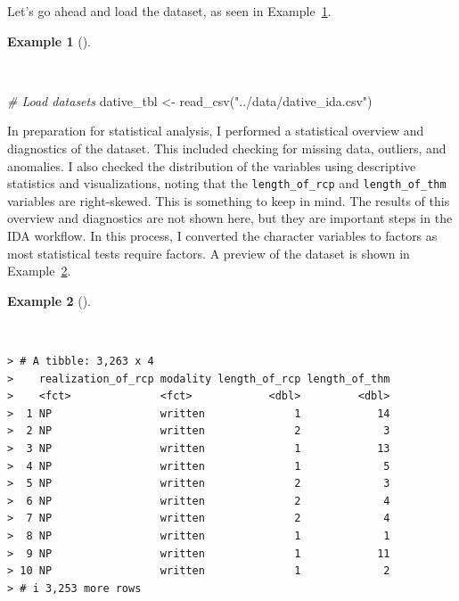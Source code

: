 \documentclass[
  letterpaper,
]{latex/krantz}
\newenvironment{Shaded}{\begin{snugshade}}{\end{snugshade}}
\newcommand{\CommentTok}[1]{\textcolor[rgb]{0.00,0.00,0.00}{\textit{#1}}}
\newcommand{\FunctionTok}[1]{\textcolor[rgb]{0.00,0.00,0.00}{#1}}
\newcommand{\NormalTok}[1]{\textcolor[rgb]{0.00,0.00,0.00}{#1}}
\newcommand{\OtherTok}[1]{\textcolor[rgb]{0.00,0.00,0.00}{#1}}
\newcommand{\StringTok}[1]{\textcolor[rgb]{0.00,0.00,0.00}{#1}}
\theoremstyle{definition}
\newtheorem{example}{Example}[chapter]
\theoremstyle{remark}
\begin{document}
Let's go ahead and load the dataset, as seen in
Example~\ref{exm-ida-cat-read-dative}.

\begin{example}[]\protect\hypertarget{exm-ida-cat-read-dative}{}\label{exm-ida-cat-read-dative}

~

\begin{Shaded}
\begin{Highlighting}[]
\CommentTok{\# Load datasets}
\NormalTok{dative\_tbl }\OtherTok{\textless{}{-}}
  \FunctionTok{read\_csv}\NormalTok{(}\StringTok{"../data/dative\_ida.csv"}\NormalTok{)}
\end{Highlighting}
\end{Shaded}

\end{example}

In preparation for statistical analysis, I performed a statistical
overview and diagnostics of the dataset. This included checking for
missing data, outliers, and anomalies. I also checked the distribution
of the variables using descriptive statistics and visualizations, noting
that the \texttt{length\_of\_rcp} and \texttt{length\_of\_thm} variables
are right-skewed. This is something to keep in mind. The results of this
overview and diagnostics are not shown here, but they are important
steps in the IDA workflow. In this process, I converted the character
variables to factors as most statistical tests require factors. A
preview of the dataset is shown in
Example~\ref{exm-ida-cat-dative-preview}.

\begin{example}[]\protect\hypertarget{exm-ida-cat-dative-preview}{}\label{exm-ida-cat-dative-preview}

~

\begin{verbatim}
> # A tibble: 3,263 x 4
>    realization_of_rcp modality length_of_rcp length_of_thm
>    <fct>              <fct>            <dbl>         <dbl>
>  1 NP                 written              1            14
>  2 NP                 written              2             3
>  3 NP                 written              1            13
>  4 NP                 written              1             5
>  5 NP                 written              2             3
>  6 NP                 written              2             4
>  7 NP                 written              2             4
>  8 NP                 written              1             1
>  9 NP                 written              1            11
> 10 NP                 written              1             2
> # i 3,253 more rows
\end{verbatim}

\end{example}
\end{document}
